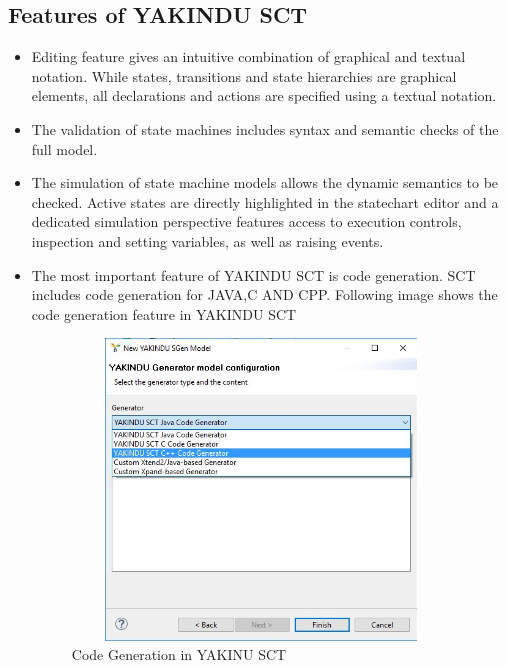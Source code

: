 \documentclass{article}
\begin{document}
\subsection{Features of YAKINDU SCT}
\begin{itemize}
\item Editing feature gives an intuitive combination of graphical and textual notation. While states, transitions and state hierarchies are graphical elements, all declarations and actions are specified using a textual notation.\\
\item The validation of state machines includes syntax and semantic checks of the full model.\\
\item The simulation of state machine models allows the dynamic semantics to be checked. Active states are directly highlighted in the statechart editor and a dedicated simulation perspective features access to execution controls, inspection and setting variables, as well as raising events.\\
\item The most important feature of YAKINDU SCT is code generation. SCT includes code generation for JAVA,C AND CPP. Following image shows the code generation feature in YAKINDU SCT\\
\begin{figure}[h]
\centering
\includegraphics[width=10cm,height=8cm]{code.jpg}
\caption{Code Generation in YAKINU SCT}
\end{figure}
\end{itemize}
\newpage
\end{document}
